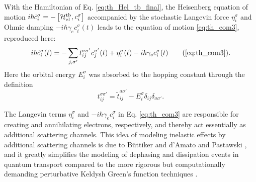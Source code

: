 With the Hamiltonian of Eq. \eqref{eq:th_Hel_tb_final}, the Heisenberg equation of motion $i\hbar \dot{c}_i^{\sigma} = - \left[\mathcal{H}_{\textrm{el}}^{\textrm{tb}},c_i^{\sigma} \right]$ \cite{ballentine} accompanied by the stochastic Langevin force $\eta_i^{\sigma}$ and Ohmic damping $-i\hbar \gamma_e c_i^{\sigma}(t)$ \cite{dhar03} leads to the equation of motion \eqref{eq:th_eom3}, reproduced here:
\begin{equation}
 i\hbar \dot{c}_i^{\sigma}(t) = -\sum_{j,\sigma'} t_{ij}^{\sigma\sigma'} c_j^{\sigma'}(t) +\eta_i^{\sigma}(t) - i\hbar \gamma_e c_i^{\sigma}(t) \tag{\ref{eq:th_eom3}}.
\end{equation}
Here the orbital energy $E_i^{\sigma}$ was absorbed to the hopping constant through the definition 
\begin{equation}
 t_{ij}^{\sigma\sigma'}=\tilde t_{ij}^{\sigma\sigma'}-E_{i}^{\sigma}\delta_{ij}\delta_{\sigma\sigma'}.
\end{equation}


The Langevin terms $\eta_i^{\sigma}$ and $-i\hbar \gamma_e c_i^{\sigma}$ in Eq. \eqref{eq:th_eom3} are responsible for creating and annihilating electrons, respectively, and thereby act essentially as additional scattering channels. This idea of modeling inelastic effects by additional scattering channels is due to B\"uttiker \cite{buttiker86} and d'Amato and Pastawski \cite{damato90}, and it greatly simplifies the modeling of dephasing and dissipation events in quantum transport compared to the more rigorous but computationally demanding perturbative Keldysh Green's function techniques \cite{haugjauho}. %

